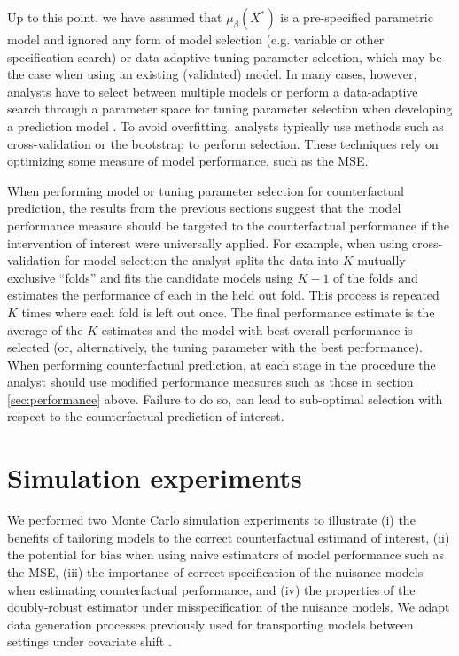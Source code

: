 Up to this point, we have assumed that $\mu_{\beta}(X^*)$ is a pre-specified parametric model and ignored any form of model selection (e.g. variable or other specification search) or data-adaptive tuning parameter selection, which may be the case when using an existing (validated) model. In many cases, however, analysts have to select between multiple models or perform a data-adaptive search through a parameter space for tuning parameter selection when developing a prediction model \cite{steyerberg_clinical_2019}. To avoid overfitting, analysts typically use methods such as cross-validation or the bootstrap to perform selection. These techniques rely on optimizing some measure of model performance, such as the MSE.

When performing model or tuning parameter selection for counterfactual prediction, the results from the previous sections suggest that the model performance measure should be targeted to the counterfactual performance if the intervention of interest were universally applied. For example, when using cross-validation for model selection the analyst splits the data into $K$ mutually exclusive ``folds'' and fits the candidate models using $K - 1$ of the folds and estimates the performance of each in the held out fold. This process is repeated $K$ times where each fold is left out once. The final performance estimate is the average of the $K$ estimates and the model with best overall performance is selected (or, alternatively, the tuning parameter with the best performance). When performing counterfactual prediction, at each stage in the procedure the analyst should use modified performance measures such as those in section \ref{sec:performance} above. Failure to do so, can lead to sub-optimal selection with respect to the counterfactual prediction of interest. 


\section{Simulation experiments} \label{sec:simulation}
We performed two Monte Carlo simulation experiments to illustrate (i) the benefits of tailoring models to the correct counterfactual estimand of interest, (ii) the potential for bias when using naive estimators of model performance such as the MSE, (iii) the importance of correct specification of the nuisance models when estimating counterfactual performance, and (iv) the properties of the doubly-robust estimator under misspecification of the nuisance models. We adapt data generation processes previously used for transporting models between settings under covariate shift \cite{steingrimsson_transporting_2023, morrison_robust_2022}.

